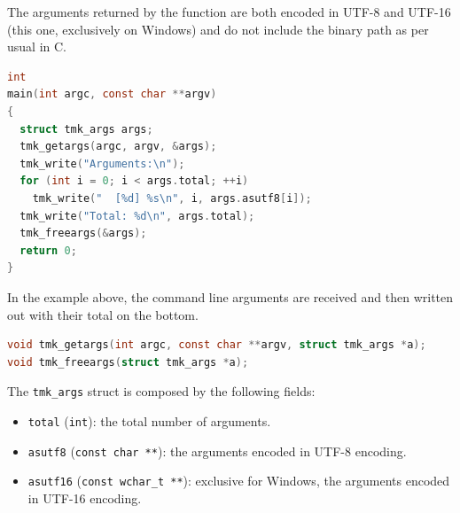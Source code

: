 \documentclass{report}
\begin{document}
The arguments returned by the function are both encoded in UTF-8 and UTF-16 (this one, exclusively on Windows) and do not include the binary path as per usual in C.
\begin{lstlisting}[language=c,caption=an example that gets the command line arguments.]
int
main(int argc, const char **argv)
{
  struct tmk_args args;
  tmk_getargs(argc, argv, &args);
  tmk_write("Arguments:\n");
  for (int i = 0; i < args.total; ++i)
    tmk_write("  [%d] %s\n", i, args.asutf8[i]);
  tmk_write("Total: %d\n", args.total);
  tmk_freeargs(&args);
  return 0;
}
\end{lstlisting}

In the example above, the command line arguments are received and then written out with their total on the bottom.
\begin{lstlisting}[language=c,caption=the declarations of the arguments function.]
void tmk_getargs(int argc, const char **argv, struct tmk_args *a);
void tmk_freeargs(struct tmk_args *a);
\end{lstlisting}

The \texttt{tmk\_args} struct is composed by the following fields:
\begin{itemize}
  \item \texttt{total} (\texttt{int}): the total number of arguments.
  \item \texttt{asutf8} (\texttt{const char **}): the arguments encoded in UTF-8 encoding.
  \item \texttt{asutf16} (\texttt{const wchar\_t **}): exclusive for Windows, the arguments encoded in UTF-16 encoding.
\end{itemize}
\end{document}
